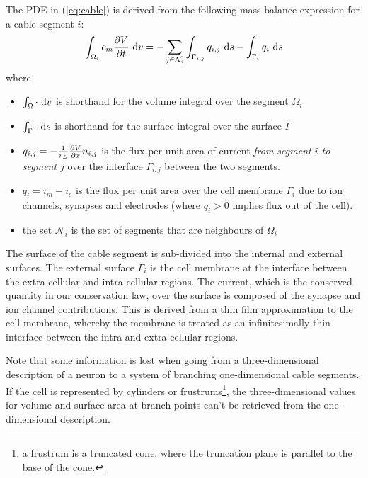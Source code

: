 The PDE in (\ref{eq:cable}) is derived from the following mass balance expression for a cable segment $i$:
\begin{equation}
    \int_{\Omega_i}{c_m \frac{\partial{V}}{\partial{t}} } ~\text{d}{v} =
        - \sum_{j\in\mathcal{N}_i} {\int_{\Gamma_{i,j}} q_{i,j} ~\text{d}{s} }
        - \int_{\Gamma_{i}} {q_i} ~\text{d}{s}
    \label{eq:cable_balance}
\end{equation}
where
\begin{itemize}
    \item $\int_\Omega \cdot ~\text{d}{v}$ is shorthand for the volume integral over the segment $\Omega_i$
    \item $\int_\Gamma \cdot ~\text{d}{s}$ is shorthand for the surface integral over the surface $\Gamma$
    \item $q_{i,j}=-\frac{1}{r_L}\frac{\partial{V}}{\partial{x}} n_{i,j}$ is the flux per unit area of current \emph{from segment $i$ to segment $j$} over the interface $\Gamma_{i,j}$ between the two segments.
    \item $q_i=i_m - i_e$ is the flux per unit area over the cell membrane $\Gamma_i$ due to ion channels, synapses and electrodes (where $q_i>0$ implies flux out of the cell).
    \item the set $\mathcal{N}_i$ is the set of segments that are neighbours of $\Omega_i$
\end{itemize}

The surface of the cable segment is sub-divided into the internal and external surfaces.
The external surface $\Gamma_{i}$ is the cell membrane at the interface between the extra-cellular and intra-cellular regions.
The current, which is the conserved quantity in our conservation law, over the surface is composed of the synapse and ion channel contributions.
This is derived from a thin film approximation to the cell membrane, whereby the membrane is treated as an infinitesimally thin interface between the intra and extra cellular regions.

Note that some information is lost when going from a three-dimensional description of a neuron to a system of branching one-dimensional cable segments.
If the cell is represented by cylinders or frustrums\footnote{a frustrum is a truncated cone, where the truncation plane is parallel to the base of the cone.}, the three-dimensional values for volume and surface area at branch points can't be retrieved from the one-dimensional description.

